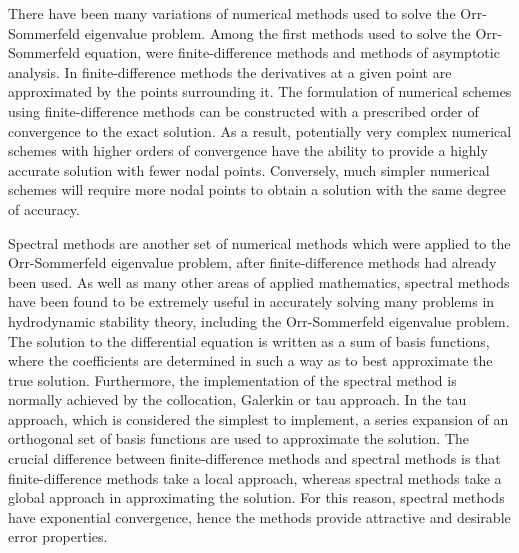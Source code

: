 \documentclass[a4paper, 12pt, twoside, openright]{article}
\numberwithin{equation}{section}
\begin{document}
There have been many variations of numerical methods used to solve the Orr-Sommerfeld eigenvalue problem. Among the first methods used to solve the Orr-Sommerfeld equation, were finite-difference methods and methods of asymptotic analysis. In finite-difference methods the derivatives at a given point are approximated by the points surrounding it. The formulation of numerical schemes using finite-difference methods can be constructed with a prescribed order of convergence to the exact solution. As a result, potentially very complex numerical schemes with higher orders of convergence have the ability to provide a highly accurate solution with fewer nodal points. Conversely, much simpler numerical schemes will require more nodal points to obtain a solution with the same degree of accuracy. %

Spectral methods are another set of numerical methods which were applied to the Orr-Sommerfeld eigenvalue problem, after finite-difference methods had already been used. As well as many other areas of applied mathematics, spectral methods have been found to be extremely useful in accurately solving many problems in hydrodynamic stability theory, including the Orr-Sommerfeld eigenvalue problem. The solution to the differential equation is written as a sum of basis functions, where the coefficients are determined in such a way as to best approximate the true solution. Furthermore, the implementation of the spectral method is normally achieved by the collocation, Galerkin or tau approach. In the tau approach, which is considered the simplest to implement, a series expansion of an orthogonal set of basis functions are used to approximate the solution. The crucial difference between finite-difference methods and spectral methods is that finite-difference methods take a local approach, whereas spectral methods take a global approach in approximating the solution. For this reason, spectral methods have exponential convergence, hence the methods provide attractive and desirable error properties. %
\end{document}
